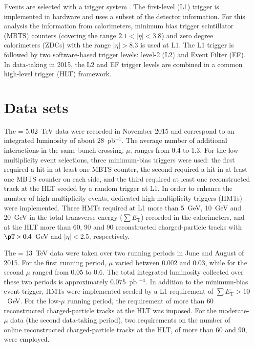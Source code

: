 \documentclass[cernpreprint,texlive=2014,txfonts,UKenglish]{latex/atlasdoc}
\begin{document}
Events are selected with a trigger system \cite{atlas-trigger-2010}.
The first-level (L1) trigger is implemented in hardware and uses a subset of the detector information. For this analysis the information from calorimeters, minimum bias trigger scintillator (MBTS) counters (covering the range $2.1 < |\eta| < 3.8$) and zero degree calorimeters (ZDCs) with the range $|\eta| > 8.3$ is used at L1.
The L1 trigger is followed by two software-based trigger levels: level-2 (L2) and Event Filter (EF). In \pp data-taking in 2015, the L2 and EF trigger levels are combined in a common high-level trigger (HLT) framework. 

\section{Data sets}
\label{sec:sets}

The \sqs= 5.02~TeV \pp data were recorded in November 2015 and correspond to an integrated luminosity of about 28~pb$^{-1}$. The average number of additional interactions in the same bunch crossing, $\mu$, ranges from 0.4 to 1.3.  For the low-multiplicity event selections, three minimum-bias triggers were used:  the first required a hit in at least one MBTS counter, the second required a hit in at least one MBTS counter on each side, and the third required at least one reconstructed track at the HLT seeded by a random trigger at L1.  In order to enhance the number of high-multiplicity events, dedicated high-multiplicity triggers (HMTs) were implemented. Three HMTs required at L1 more than 5~GeV, 10~GeV and 20~GeV in the total transverse energy ($\sum E_{\mathrm{T}}$) recorded in the calorimeters, and at the HLT more than 60, 90 and 90 reconstructed charged-particle tracks with $\pT > 0.4$~GeV and $|\eta|<2.5$, respectively. 

The \sqs= 13~TeV \pp data were taken over two running periods in June and August of 2015. For the first running period, $\mu$ varied between 0.002 and 0.03, while for the second $\mu$ ranged from 0.05 to 0.6. The total integrated luminosity collected over these two periods is approximately 0.075~pb $^{-1}$. In addition to the minimum-bias event trigger, HMTs were implemented seeded by a L1 requirement of $\sum E_{\mathrm{T}} > 10$~GeV. For the low-$\mu$ running period, the requirement of  more than 60 reconstructed charged-particle tracks at the HLT was imposed. For the moderate-$\mu$ data (the second data-taking period), two requirements on the number of online reconstructed charged-particle tracks at the HLT, of more than 60 and 90, were employed. 
\end{document}
